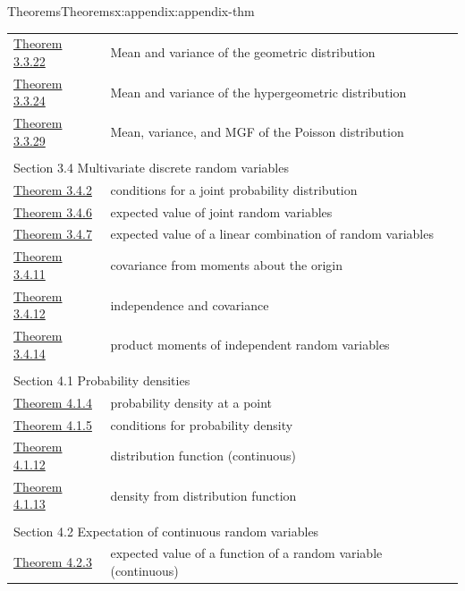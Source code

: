 \documentclass[oneside,10pt,]{book}
\begin{document}
\begin{appendixptx}{Theorems}{}{Theorems}{}{}{x:appendix:appendix-thm}
\begin{longtable}[l]{ll}
\hyperref[g:theorem:idp140500432132256]{Theorem 3.3.22}& Mean and variance of the geometric distribution\\
\hyperref[g:theorem:idp140500432146048]{Theorem 3.3.24}& Mean and variance of the hypergeometric distribution\\
\hyperref[g:theorem:idp140500432167168]{Theorem 3.3.29}& Mean, variance, and MGF of the Poisson distribution\\
\multicolumn{2}{l}{\null}\\[1.5ex] \multicolumn{2}{l}{\large Section 3.4 Multivariate discrete random variables}\\[0.5ex]
\hyperref[x:theorem:thm-3-7]{Theorem 3.4.2}& conditions for a joint probability distribution\\
\hyperref[x:theorem:thm-expected-value-joint-random-variables-4-4]{Theorem 3.4.6}& expected value of joint random variables\\
\hyperref[x:theorem:thm-4-5]{Theorem 3.4.7}& expected value of a linear combination of random variables\\
\hyperref[x:theorem:thm-4-11]{Theorem 3.4.11}& covariance from moments about the origin\\
\hyperref[x:theorem:thm-4-12]{Theorem 3.4.12}& independence and covariance\\
\hyperref[x:theorem:thm-4-13]{Theorem 3.4.14}& product moments of independent random variables\\
\multicolumn{2}{l}{\null}\\[1.5ex] \multicolumn{2}{l}{\large Section 4.1 Probability densities}\\[0.5ex]
\hyperref[x:theorem:thm-continuous-point]{Theorem 4.1.4}& probability density at a point\\
\hyperref[x:theorem:thm-continuous-conditions-3-1]{Theorem 4.1.5}& conditions for probability density\\
\hyperref[x:theorem:thm-continuous-th-3-2]{Theorem 4.1.12}& distribution function (continuous)\\
\hyperref[x:theorem:thm-pdf-cdf]{Theorem 4.1.13}& density from distribution function\\
\multicolumn{2}{l}{\null}\\[1.5ex] \multicolumn{2}{l}{\large Section 4.2 Expectation of continuous random variables}\\[0.5ex]
\hyperref[x:theorem:thm-expected-value-function-random-variable-4-1-cont]{Theorem 4.2.3}& expected value of a function of a random variable (continuous)\\

\end{longtable}
\end{appendixptx}
\end{document}
